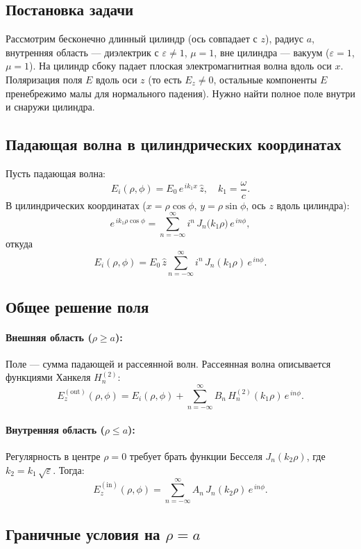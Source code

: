\documentclass{article}
\begin{document}
\subsection*{Постановка задачи}

Рассмотрим бесконечно длинный цилиндр (ось совпадает с $z$), радиус $a$, внутренняя область --- диэлектрик с $\varepsilon\neq 1$, $\mu=1$, вне цилиндра --- вакуум ($\varepsilon=1$, $\mu=1$).
На цилиндр сбоку падает плоская электромагнитная волна вдоль оси $x$.
Поляризация поля $E$ вдоль оси $z$ (то есть $E_z \neq 0$, остальные компоненты $E$ пренебрежимо малы для нормального падения).
Нужно найти полное поле внутри и снаружи цилиндра.

\subsection*{Падающая волна в цилиндрических координатах}

Пусть падающая волна:
\[
E_i(\rho,\phi) = E_0\,e^{\,i k_1 x}\,\hat{z},
\quad
k_1 = \frac{\omega}{c}.
\]
В цилиндрических координатах ($x = \rho\cos\phi$, $y=\rho\sin\phi$, ось $z$ вдоль цилиндра):
\[
e^{\,i k_1 \rho\cos\phi}
=
\sum_{n=-\infty}^{\infty}
i^n\,J_n\bigl(k_1\rho\bigr)\,e^{\,i n\phi},
\]
откуда
\[
E_i(\rho,\phi)
=
E_0\,\hat{z}
\sum_{n=-\infty}^{\infty}
i^n\,J_n(k_1\rho)\,e^{\,i n\phi}.
\]

\subsection*{Общее решение поля}

\paragraph{Внешняя область (\(\rho\ge a\)):}
Поле --- сумма падающей и рассеянной волн. Рассеянная волна описывается функциями Ханкеля $H_n^{(2)}$:
\[
E_z^{(\text{out})}(\rho,\phi)
=
E_i(\rho,\phi)
+
\sum_{n=-\infty}^{\infty}
B_n\,H_n^{(2)}(k_1\rho)\,e^{\,i n\phi}.
\]

\paragraph{Внутренняя область (\(\rho\le a\)):}
Регулярность в центре $\rho=0$ требует брать функции Бесселя $J_n(k_2\rho)$, где $k_2 = k_1\,\sqrt{\varepsilon}$. Тогда:
\[
E_z^{(\text{in})}(\rho,\phi)
=
\sum_{n=-\infty}^{\infty}
A_n\,J_n(k_2\rho)\,e^{\,i n\phi}.
\]

\subsection*{Граничные условия на \(\rho=a\)}
\end{document}
